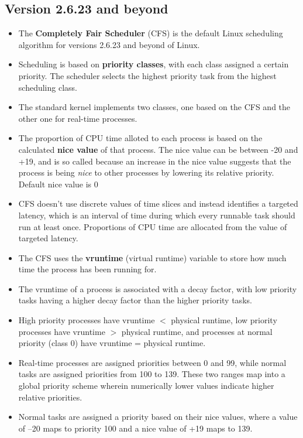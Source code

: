 \documentclass{article}
\theoremstyle{plain}
\theoremstyle{definition}
\begin{document}
\subsection{Version 2.6.23 and beyond}
\begin{itemize}
    \item The \textbf{Completely Fair Scheduler} (CFS) is the default Linux scheduling algorithm for versions 2.6.23 and beyond of Linux. 
    
    \item Scheduling is based on \textbf{priority classes}, with each class assigned a certain priority. The scheduler selects the highest priority task from the highest scheduling class. 
    
    \item The standard kernel implements two classes, one based on the CFS and the other one for real-time processes.
    
    \item The proportion of CPU time alloted to each process is based on the calculated \textbf{nice value} of that process. The nice value can be between -20 and +19, and is so called because an increase in the nice value suggests that the process is being \textit{nice} to other processes by lowering its relative priority. Default nice value is 0
    
    \item CFS doesn’t use discrete values of time slices and instead identifies a targeted latency, which is an interval of time during which every runnable task should run at least once. Proportions of CPU time are allocated from the value of targeted latency.
    
    \item The CFS uses the \textbf{vruntime} (virtual runtime) variable to store how much time the process has been running for. 
    
    \item The vruntime of a process is associated with a decay factor, with low priority tasks having a higher decay factor than the higher priority tasks.
    
    \item High priority processes have vruntime $<$ physical runtime, low priority processes have vruntime $>$ physical runtime, and processes at normal priority (class 0) have vruntime = physical runtime. 
    
    \item Real-time processes are assigned priorities between 0 and 99, while normal tasks are assigned priorities from 100 to 139. These two ranges map into a global priority scheme wherein numerically lower values indicate higher relative priorities.
    
    \item Normal tasks are assigned a priority based on their nice values, where a value of –20 maps to priority 100 and a nice value of +19 maps to 139.
\end{itemize}
\end{document}
